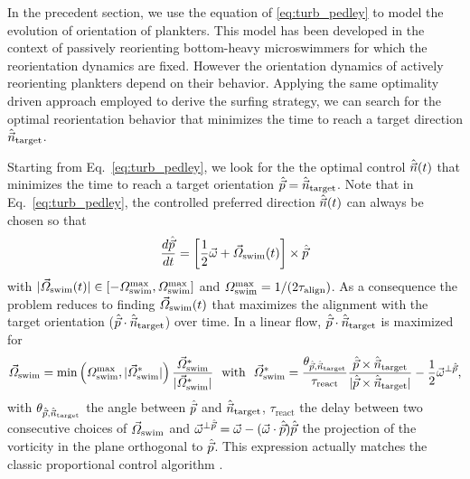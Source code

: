 In the precedent section, we use the equation of \eqref{eq:turb_pedley} to model the evolution of orientation of plankters.
This model has been developed in the context of passively reorienting bottom-heavy microswimmers for which the reorientation dynamics are fixed.
However the orientation dynamics of actively reorienting plankters depend on their behavior.
Applying the same optimality driven approach employed to derive the surfing strategy, we can search for the optimal reorientation behavior that minimizes the time to reach a target direction $\hat{\vec{n}}_{\mathrm{target}}$.

Starting from Eq.~\eqref{eq:turb_pedley}, we look for the the optimal control $\hat{\vec{n}} (t)$ that minimizes the time to reach a target orientation $\hat{\vec{p}} = \hat{\vec{n}}_{\mathrm{target}}$.
Note that in Eq.~\eqref{eq:turb_pedley}, the controlled preferred direction $\hat{\vec{n}}(t)$ can always be chosen so that
\begin{equation}
	\label{eq:active_velocity}
	\frac{d \hat{\vec{p}}}{d t} = \left[ \frac{1}{2} \vec{\omega} + \vec{\varOmega}_{\mathrm{swim}}(t) \right] \times \hat{\vec{p}}
\end{equation}
with $\lvert\vec{\varOmega}_{\mathrm{swim}}(t)\rvert \in \left[ -\varOmega_{\mathrm{swim}}^{\max}, \varOmega_{\mathrm{swim}}^{\max} \right]$ and $\varOmega_{\mathrm{swim}}^{\max} = 1/(2\tau_{\mathrm{align}})$.
As a consequence the problem reduces to finding $\vec{\varOmega}_{\mathrm{swim}}(t)$ that maximizes the alignment with the target orientation ($\hat{\vec{p}} \cdot \hat{\vec{n}}_{\mathrm{target}}$) over time.
In a linear flow, $\hat{\vec{p}} \cdot \hat{\vec{n}}_{\mathrm{target}}$ is maximized for
\begin{equation}
	\label{eq:control_solution}
	\vec{\varOmega}_{\mathrm{swim}} = \min \left( \varOmega_{\mathrm{swim}}^{\max}, \lvert\vec{\varOmega}_{\mathrm{swim}}^*\rvert \right) \frac{\vec{\varOmega}_{\mathrm{swim}}^*}{\lvert\vec{\varOmega}_{\mathrm{swim}}^*\rvert} ~ \text{ with } ~ \vec{\varOmega}_{\mathrm{swim}}^* = \frac{\theta_{\hat{\vec{p}}, \hat{\vec{n}}_{\mathrm{target}}}}{\tau_{\mathrm{react}}} \frac{\hat{\vec{p}} \times \hat{\vec{n}}_{\mathrm{target}}}{\lvert\hat{\vec{p}} \times \hat{\vec{n}}_{\mathrm{target}}\rvert} - \frac{1}{2} \vec{\omega}^{\perp \hat{\vec{p}}},
\end{equation}
with $\theta_{\hat{\vec{p}}, \hat{\vec{n}}_{\mathrm{target}}}$ the angle between $\hat{\vec{p}}$ and $\hat{\vec{n}}_{\mathrm{target}}$, $\tau_{\mathrm{react}}$ the delay between two consecutive choices of $\vec{\varOmega}_{\mathrm{swim}}$ and $\vec{\omega}^{\perp \hat{\vec{p}}} = \vec{\omega} - ( \vec{\omega} \cdot \hat{\vec{p}} ) \hat{\vec{p}}$ the projection of the vorticity in the plane orthogonal to $\hat{\vec{p}}$.
This expression actually matches the classic proportional control algorithm \citep{bequette2003process}.

